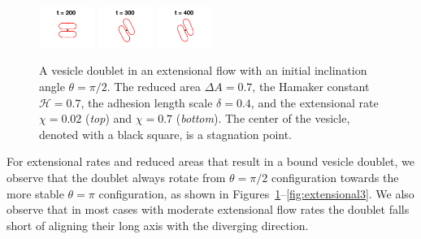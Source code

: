 \documentclass[prf,superscriptaddress,showpacs]{revtex4-1}
\begin{document}
\begin{figure}[htp]
  \includegraphics[width = 0.16\textwidth,trim={4cm 2cm 4cm 1cm},clip]{figs/extensional_adR4em1adS7em1Chi7em2_ra070_image03.png}
  \includegraphics[width = 0.16\textwidth,trim={4cm 2cm 4cm 1cm},clip]{figs/extensional_adR4em1adS7em1Chi7em2_ra070_image04.png}
  \includegraphics[width = 0.16\textwidth,trim={4cm 2cm 4cm 1cm},clip]{figs/extensional_adR4em1adS7em1Chi7em2_ra070_image05.png}
  \caption{\label{fig:extensional1} A vesicle doublet in an extensional flow with an initial inclination angle $\theta=\pi/2$.  The
  reduced area $\Delta A = 0.7$, the Hamaker constant $\mathcal{H} =
  0.7$, the adhesion length scale $\delta = 0.4$, and the extensional
  rate $\chi = 0.02$ ({\em top}) and $\chi=0.7$ ({\em bottom}).  The center of the vesicle, denoted with a
  black square, is a stagnation point.}
  \end{figure}
  For extensional rates and reduced areas that result in a bound vesicle doublet, 
we observe that the doublet always rotate from $\theta=\pi/2$ configuration towards
the more stable $\theta=\pi$ configuration, as shown in Figures~\ref{fig:extensional1}--\ref{fig:extensional3}.
We also observe that in most cases with moderate extensional flow rates the doublet falls short of 
aligning their long axis with the diverging direction.

  
\end{document}
